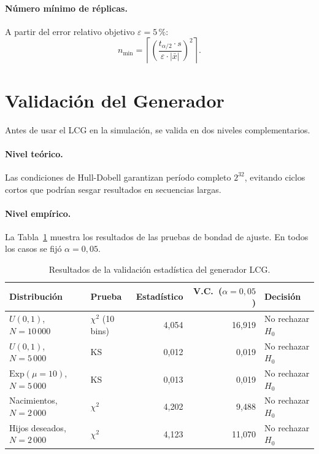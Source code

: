 \documentclass{llncs}
\begin{document}
\paragraph{Número mínimo de réplicas.}
A partir del error relativo objetivo $\varepsilon = 5\,\%$:
\[
  n_{\min} = \left\lceil \left(\frac{t_{\alpha/2} \cdot s}
             {\varepsilon \cdot |\bar{x}|}\right)^2 \right\rceil.
\]

\section{Validación del Generador}
\label{sec:validacion}

Antes de usar el LCG en la simulación, se valida en dos niveles
complementarios.

\paragraph{Nivel teórico.}
Las condiciones de Hull-Dobell garantizan período completo $2^{32}$,
evitando ciclos cortos que podrían sesgar resultados en secuencias largas.

\paragraph{Nivel empírico.}
La Tabla~\ref{tab:validacion} muestra los resultados de las pruebas de
bondad de ajuste.
En todos los casos se fijó $\alpha = 0{,}05$.

\begin{table}[H]
\caption{Resultados de la validación estadística del generador LCG.}
\label{tab:validacion}
\centering
\begin{tabular}{llrrl}
\toprule
\textbf{Distribución} & \textbf{Prueba} & \textbf{Estadístico} &
\textbf{V.C.\ ($\alpha{=}0{,}05$)} & \textbf{Decisión} \\
\midrule
$U(0,1)$, $N=10\,000$  & $\chi^2$ (10 bins) & 4{,}054 & 16{,}919 & No rechazar $H_0$ \\
$U(0,1)$, $N=5\,000$   & KS                 & 0{,}012 &  0{,}019 & No rechazar $H_0$ \\
$\text{Exp}(\mu=10)$, $N=5\,000$ & KS        & 0{,}013 &  0{,}019 & No rechazar $H_0$ \\
Nacimientos, $N=2\,000$ & $\chi^2$           & 4{,}202 &  9{,}488 & No rechazar $H_0$ \\
Hijos deseados, $N=2\,000$ & $\chi^2$        & 4{,}123 & 11{,}070 & No rechazar $H_0$ \\
\bottomrule
\end{tabular}
\end{table}
\end{document}
